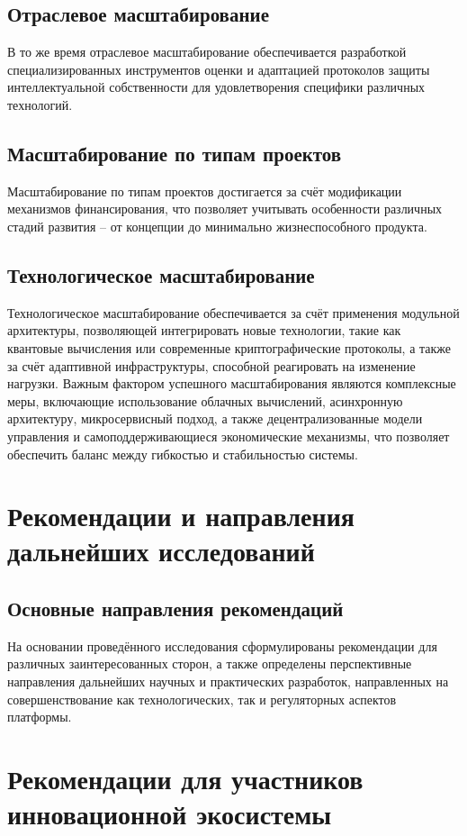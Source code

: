 \documentclass[
    candidate, %
    subf, %
    dotsinheaders=false,
]{disser}
\begin{document}
\subsection{Отраслевое масштабирование}
В то же время отраслевое масштабирование обеспечивается разработкой специализированных инструментов оценки и адаптацией протоколов защиты интеллектуальной собственности для удовлетворения специфики различных технологий.

\subsection{Масштабирование по типам проектов}
Масштабирование по типам проектов достигается за счёт модификации механизмов финансирования, что позволяет учитывать особенности различных стадий развития – от концепции до минимально жизнеспособного продукта.

\subsection{Технологическое масштабирование}
Технологическое масштабирование обеспечивается за счёт применения модульной архитектуры, позволяющей интегрировать новые технологии, такие как квантовые вычисления или современные криптографические протоколы, а также за счёт адаптивной инфраструктуры, способной реагировать на изменение нагрузки. Важным фактором успешного масштабирования являются комплексные меры, включающие использование облачных вычислений, асинхронную архитектуру, микросервисный подход, а также децентрализованные модели управления и самоподдерживающиеся экономические механизмы, что позволяет обеспечить баланс между гибкостью и стабильностью системы.

\section{Рекомендации и направления дальнейших исследований}

\subsection{Основные направления рекомендаций}
На основании проведённого исследования сформулированы рекомендации для различных заинтересованных сторон, а также определены перспективные направления дальнейших научных и практических разработок, направленных на совершенствование как технологических, так и регуляторных аспектов платформы.

\section{Рекомендации для участников инновационной экосистемы}
\end{document}
